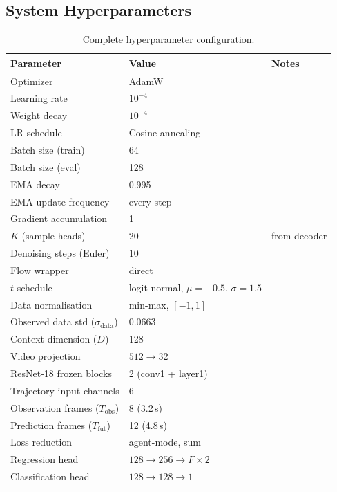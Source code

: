 \documentclass[11pt,a4paper]{article}
\begin{document}
\subsection{System Hyperparameters}
\begin{table}[ht]
\centering
\caption{Complete hyperparameter configuration.}
\label{tab:hparams}
\small
\begin{tabular}{@{}lll@{}}
\toprule
\textbf{Parameter} & \textbf{Value} & \textbf{Notes} \\
\midrule
Optimizer            & AdamW \citep{loshchilov2019decoupled} \\
Learning rate        & $10^{-4}$ \\
Weight decay         & $10^{-4}$ \\
LR schedule          & Cosine annealing \citep{loshchilov2017sgdr} \\
Batch size (train)   & 64 \\
Batch size (eval)    & 128 \\
EMA decay            & 0.995 \\
EMA update frequency & every step \\
Gradient accumulation & 1 \\
\midrule
$K$ (sample heads)          & 20   & from decoder \\
Denoising steps (Euler)      & 10   \\
Flow wrapper                 & direct \\
$t$-schedule                 & logit-normal, $\mu=-0.5$, $\sigma=1.5$ \\
Data normalisation           & min-max, $[-1,1]$ \\
Observed data std ($\sigma_{\mathrm{data}}$) & 0.0663 \\
\midrule
Context dimension ($D$)           & 128 \\
Video projection                  & $512 \to 32$ \\
ResNet-18 frozen blocks           & 2 (conv1 + layer1) \\
Trajectory input channels         & 6 \\
Observation frames ($T_{\mathrm{obs}}$) & 8 (3.2\,s) \\
Prediction frames ($T_{\mathrm{fut}}$)  & 12 (4.8\,s) \\
\midrule
Loss reduction    & agent-mode, sum \\
Regression head   & $128 \to 256 \to F \times 2$ \\
Classification head & $128 \to 128 \to 1$ \\
\bottomrule
\end{tabular}
\end{table}
\end{document}
